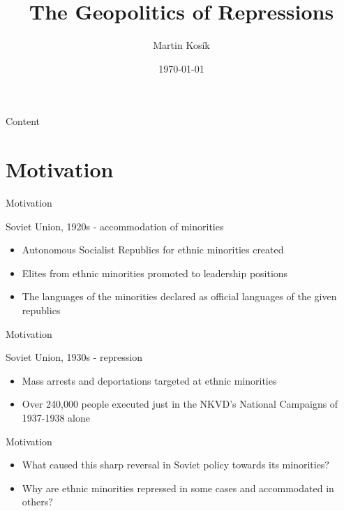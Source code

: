 \documentclass[11pt]{beamer}
\title{The Geopolitics of Repressions}
\date{\today}
\author{Martin Kosík}
\institute{Charles University}
\begin{document}
\begin{frame}
\titlepage
\end{frame}
\begin{frame}{Content}
\tableofcontents
\end{frame}


\section{Motivation}
\begin{frame}{Motivation}
 \begin{block}{Soviet Union, 1920s -  accommodation of minorities}  {
\begin{itemize}
    \item Autonomous Socialist Republics for ethnic minorities created
    \item Elites from ethnic minorities  promoted to leadership positions
    \item  The languages of the minorities declared as official languages of the given republics
\end{itemize}}
\end{block} 
\end{frame}

\begin{frame}{Motivation}
 \begin{block}{Soviet Union, 1930s - repression}  {
\begin{itemize}
    \item Mass arrests and deportations targeted at ethnic minorities
    \item  Over 240,000 people executed just in the NKVD's National Campaigns of 1937-1938 alone \citep[p. 855]{martin_origins_1998}
\end{itemize}}
\end{block} 

\end{frame}

\begin{frame}{Motivation}
\begin{itemize}
    \item What caused this sharp reversal in Soviet policy towards its minorities?
    \item Why are ethnic minorities repressed in some cases and accommodated in others?
\end{itemize}

\end{frame}
\end{document}
